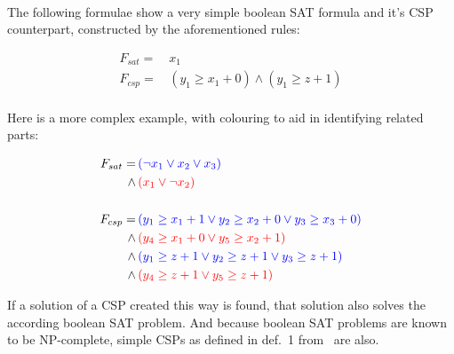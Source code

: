 \paragraph{}
The following formulae show a very simple boolean SAT formula and it's CSP counterpart, constructed by the aforementioned rules:

\begin{align*}
    F_{sat} =\, &x_1\\
    F_{csp} =\, &(y_1 \geq x_1 + 0) \wedge (y_1 \geq z + 1)
\end{align*}

\paragraph{}
Here is a more complex example, with colouring to aid in identifying related parts:

\begin{align*}
    F_{sat} =\,      &\textcolor{blue}{ (\neg x_1 \vee x_2 \vee x_3) }\\
            \wedge\, &\textcolor{red}{  (x_1 \vee \neg x_2)          }\\
    \\
    F_{csp} =\,      &\textcolor{blue}{ (y_1 \geq x_1 + 1 \vee y_2 \geq x_2 + 0 \vee y_3 \geq x_3 + 0) }\\
            \wedge\, &\textcolor{red}{  (y_4 \geq x_1 + 0 \vee y_5 \geq x_2 + 1)                       }\\
            \wedge\, &\textcolor{blue}{ (y_1 \geq z + 1 \vee y_2 \geq z + 1 \vee y_3 \geq z + 1)       }\\
            \wedge\, &\textcolor{red}{  (y_4 \geq z + 1 \vee y_5 \geq z + 1)                           }
\end{align*}

If a solution of a CSP created this way is found, that solution also solves the according boolean SAT problem.
And because boolean SAT problems are known to be NP-complete, simple CSPs as defined in def.~1 from~\cite{MF19} are also.
